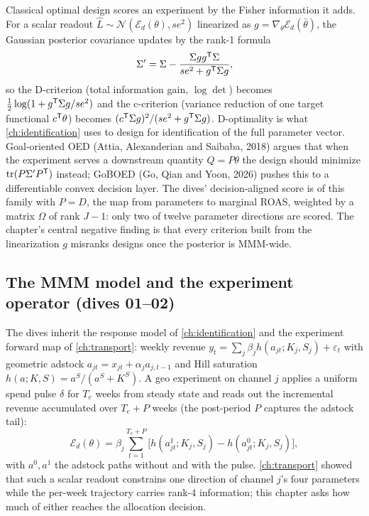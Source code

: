 Classical optimal design scores an experiment by the Fisher information it adds. For a scalar readout $\hat L \sim \mathcal N(\mathcal E_d(\theta), se^2)$ linearized as $g = \nabla_\theta\mathcal E_d(\bar\theta)$, the Gaussian posterior covariance updates by the rank-1 formula
\begin{equation}
\Sigma' = \Sigma - \frac{\Sigma g g^{\mathsf{T}} \Sigma}{se^2 + g^{\mathsf{T}} \Sigma g},
\label{voi:eq:rank1}
\end{equation}
so the D-criterion (total information gain, $\log\det$) becomes $\tfrac12\log(1 + g^{\mathsf{T}}\Sigma g/se^2)$ and the c-criterion (variance reduction of one target functional $c^{\mathsf{T}}\theta$) becomes $(c^{\mathsf{T}}\Sigma g)^2/(se^2 + g^{\mathsf{T}}\Sigma g)$. D-optimality is what \cref{ch:identification} uses to design for identification of the full parameter vector. Goal-oriented OED (Attia, Alexanderian and Saibaba, 2018) argues that when the experiment serves a downstream quantity $Q = P\theta$ the design should minimize $\operatorname{tr}(P\Sigma'P^{\mathsf{T}})$ instead; GoBOED (Go, Qian and Yoon, 2026) pushes this to a differentiable convex decision layer. The dives' decision-aligned score is of this family with $P = D$, the map from parameters to marginal ROAS, weighted by a matrix $\Omega$ of rank $J - 1$: only two of twelve parameter directions are scored. The chapter's central negative finding is that every criterion built from the linearization $g$ misranks designs once the posterior is MMM-wide.

\subsection{The MMM model and the experiment operator (dives 01--02)}

The dives inherit the response model of \cref{ch:identification} and the experiment forward map of \cref{ch:transport}: weekly revenue $y_t = \sum_j \beta_j h(a_{jt}; K_j, S_j) + \varepsilon_t$ with geometric adstock $a_{jt} = x_{jt} + \alpha_j a_{j,t-1}$ and Hill saturation $h(a;K,S) = a^S/(a^S + K^S)$. A geo experiment on channel $j$ applies a uniform spend pulse $\delta$ for $T_e$ weeks from steady state and reads out the incremental revenue accumulated over $T_e + P$ weeks (the post-period $P$ captures the adstock tail):
\begin{equation}
\mathcal E_d(\theta) = \beta_j \sum_{t=1}^{T_e+P} \big[h(a^{1}_{jt};K_j,S_j) - h(a^{0}_{jt};K_j,S_j)\big],
\label{voi:eq:operator}
\end{equation}
with $a^0, a^1$ the adstock paths without and with the pulse. \cref{ch:transport} showed that such a scalar readout constrains one direction of channel $j$'s four parameters while the per-week trajectory carries rank-4 information; this chapter asks how much of either reaches the allocation decision.

